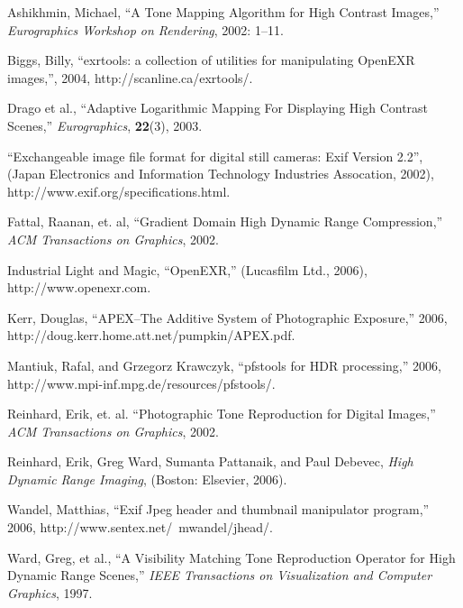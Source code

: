 \begin{verbatim}
\end{verbatim}

\begin{thebibliography}{1}

 Ashikhmin, Michael, ``A Tone Mapping Algorithm for High Contrast Images,''
{\em Eurographics Workshop on Rendering}, 2002: 1--11.

 Biggs, Billy, ``exrtools: a collection of utilities for manipulating
OpenEXR images,'', 2004, http://scanline.ca/exrtools/.

 Drago et al., ``Adaptive Logarithmic Mapping For Displaying High Contrast Scenes,''
{\em Eurographics}, {\bf 22}(3), 2003.

 ``Exchangeable image file format for digital still cameras: Exif Version 2.2'',
(Japan Electronics and Information Technology Industries Assocation, 2002),
http://www.exif.org/specifications.html.

 Fattal, Raanan, et. al, ``Gradient Domain High Dynamic Range Compression,''
{\em ACM Transactions on Graphics}, 2002.

 Industrial Light and Magic, ``OpenEXR,'' (Lucasfilm Ltd., 2006),
http://www.openexr.com.

 Kerr, Douglas, ``APEX--The Additive System of Photographic Exposure,'' 2006,
http://doug.kerr.home.att.net/pumpkin/APEX.pdf.

 Mantiuk, Rafal, and Grzegorz Krawczyk, ``pfstools for HDR processing,'' 2006,
http://www.mpi-inf.mpg.de/resources/pfstools/.

 Reinhard, Erik, et. al. ``Photographic Tone Reproduction for Digital Images,''
{\em ACM Transactions on Graphics}, 2002.

 Reinhard, Erik, Greg Ward, Sumanta Pattanaik, and Paul Debevec,
{\em High Dynamic Range Imaging}, (Boston: Elsevier, 2006).

 Wandel, Matthias, ``Exif Jpeg header and thumbnail manipulator program,'' 2006,
http://www.sentex.net/~mwandel/jhead/.

 Ward, Greg, et al., ``A Visibility Matching Tone Reproduction Operator for High Dynamic Range Scenes,''
{\em IEEE Transactions on Visualization and Computer Graphics}, 1997.

\end{thebibliography}
